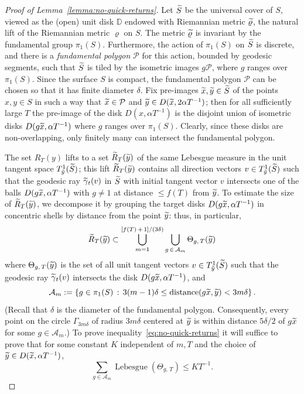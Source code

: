 \documentclass[10pt]{amsart}
\theoremstyle{definition}\newtheorem{defi}[theo]{Definition}\newtheorem{rema}[theo]{Remark}\newtheorem{exam}[theo]{Example}\newtheorem{exem}[theo]{Example}\newtheorem{nota}[theo]{Notation}
\newcommand{\xset}[1]{\left\{ #1 \right\}}
\DeclareMathOperator{\Lebesgue}{Lebesgue}
\DeclareMathOperator{\distance}{distance}
\let\oldtilde\tilde
\renewcommand*{\tilde}[1]{\mathchoice{\widetilde{#1}}{\widetilde{#1}}{\oldtilde{#1}}{\oldtilde{#1}}}\let\oldforall\forall
\renewcommand*{\forall}{\mathrel{\oldforall}}
\begin{document}
\begin{proof}[Proof of Lemma~\ref{lemma:no-quick-returns}]
Let $\tilde{S}$ be the universal cover of $S$, viewed as the (open) unit disk $\mathbb{D}$ endowed with Riemannian metric $\tilde{\varrho}$, the natural lift of the Riemannian metric $\varrho$ on $S$. The metric $\tilde{\varrho}$ is invariant by the fundamental group $\pi_{1}(S)$. Furthermore, the action of $\pi_{1}(S)$ on $\tilde{S}$ is discrete, and there is a \emph{fundamental polygon} $\mathcal{P}$ for this action, bounded by geodesic segments, such that $\tilde{S}$ is tiled by the isometric images $g\mathcal{P}$, where $g$ ranges over $\pi_{1}(S)$. Since the surface $S$ is compact, the fundamental polygon $\mathcal{P}$ can be chosen so that it has finite diameter $\delta$. Fix pre-images $\tilde{x}, \tilde{y}\in \tilde{S}$ of the points $x,y\in S$ in such a way that $\tilde{x}\in \mathcal{P}$ and $\tilde{y}\in D(\tilde{x}, 2 \alpha T^{-1})$; then for all sufficiently large $T$ the pre-image of the disk $D(x, \alpha T^{-1})$ is the disjoint union of isometric disks $D(g \tilde{x}, \alpha T^{-1})$ where $g$ ranges over $\pi_{1}(S)$. Clearly, since these disks are non-overlapping, only finitely many can intersect the fundamental polygon.

The set $R_{T}(y)$ lifts to a set $\tilde{R}_{T}(\tilde{y})$ of the same Lebesgue measure in the unit tangent space $T^{1}_{\tilde{y}}(\tilde{S})$; this lift $\tilde{R}_{T}(\tilde{y})$ contains all direction vectors $v\in T^{1}_{\tilde{y}}(\tilde{S})$ such that the geodesic ray $\tilde{\gamma}_{t}(v)$ in $\tilde{S}$ with initial tangent vector $v$ intersects one of the balls $D(g \tilde{x}, \alpha T^{-1})$ with $g \not = 1$ at distance $\leq f(T)$ from $\tilde{y}$. To estimate the size of $\tilde{R}_{T}(\tilde{y})$, we decompose it by grouping the target disks $D(g\tilde{x}, \alpha T^{-1})$ in concentric shells by distance from the point $\tilde{y}$: thus, in particular,
\[
\tilde{R}_{T}(\tilde{y})\subset
\bigcup_{m=1}^{[f(T)\,+\,1]/(3\delta)}\bigcup_{g\,\in\, \mathcal{A}_{m}}
\Theta_{g,\,T} (\tilde{y})
\]
where $\Theta_{g,\,T}(\tilde{y})$ is the set of all unit tangent vectors $v \in T^{1}_{\tilde{y}}(\tilde{S})$ such that the geodesic ray $\tilde{\gamma}_{t}(v)$ intersects the disk $D(g\tilde{x},\alpha T^{-1})$, and
\[
\mathcal{A}_{m}:=\xset {g\in \pi_{1}(S) \,:\, 3(m-1)\delta \leq\distance(g \tilde{x}, \tilde{y}) < 3m\delta}.
\]
(Recall that $\delta$ is the diameter of the fundamental polygon. Consequently, every point on the circle $\Gamma_{3m\delta}$ of radius $3 m \delta$ centered at $\tilde{y}$ is within distance $5\delta/2$ of $g\tilde{x}$ for some $g \in \mathcal{A}_{m}$.) To prove inequality~\eqref{eq:no-quick-returns} it will suffice to prove that for some constant $K$ independent of $m,T$ and the choice of $\tilde{y}\in D(\tilde{x}, \alpha T^{-1})$,
\begin{equation}\label{eq:shadow}
\sum_{g \in \mathcal{A}_{m}}\Lebesgue (\Theta_{g,\,T})\leq K T^{-1}.
\end{equation}


\end{proof}
\end{document}
